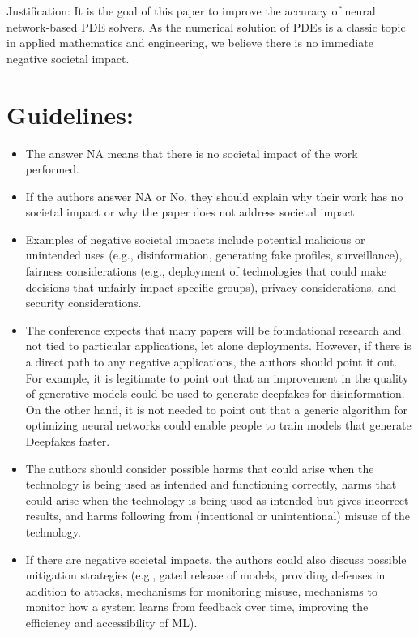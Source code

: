 \documentclass[10pt]{article}
\begin{document}
Justification: It is the goal of this paper to improve the accuracy of neural network-based PDE solvers. As the numerical solution of PDEs is a classic topic in applied mathematics and engineering, we believe there is no immediate negative societal impact.

\section*{Guidelines:}
\begin{itemize}
  \item The answer NA means that there is no societal impact of the work performed.
  \item If the authors answer NA or No, they should explain why their work has no societal impact or why the paper does not address societal impact.
  \item Examples of negative societal impacts include potential malicious or unintended uses (e.g., disinformation, generating fake profiles, surveillance), fairness considerations (e.g., deployment of technologies that could make decisions that unfairly impact specific groups), privacy considerations, and security considerations.
  \item The conference expects that many papers will be foundational research and not tied to particular applications, let alone deployments. However, if there is a direct path to any negative applications, the authors should point it out. For example, it is legitimate to point out that an improvement in the quality of generative models could be used to generate deepfakes for disinformation. On the other hand, it is not needed to point out that a generic algorithm for optimizing neural networks could enable people to train models that generate Deepfakes faster.
  \item The authors should consider possible harms that could arise when the technology is being used as intended and functioning correctly, harms that could arise when the technology is being used as intended but gives incorrect results, and harms following from (intentional or unintentional) misuse of the technology.
  \item If there are negative societal impacts, the authors could also discuss possible mitigation strategies (e.g., gated release of models, providing defenses in addition to attacks, mechanisms for monitoring misuse, mechanisms to monitor how a system learns from feedback over time, improving the efficiency and accessibility of ML).
\end{itemize}
\end{document}
